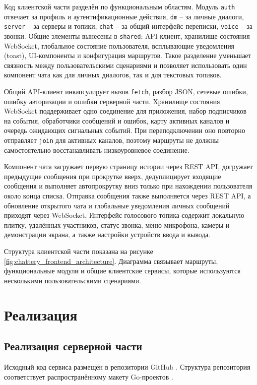 \documentclass[a4paper,12pt]{extarticle}
\begin{document}
Код клиентской части разделён по функциональным областям. Модуль \texttt{auth} отвечает за профиль и аутентификационные действия, \texttt{dm} -- за личные диалоги, \texttt{server} -- за серверы и топики, \texttt{chat} -- за общий интерфейс переписки, \texttt{voice} -- за звонки. Общие элементы вынесены в \texttt{shared}: API-клиент, хранилище состояния WebSocket, глобальное состояние пользователя, всплывающие уведомления (toast), UI-компоненты и конфигурация маршрутов. Такое разделение уменьшает связность между пользовательскими сценариями и позволяет использовать один компонент чата как для личных диалогов, так и для текстовых топиков.

Общий API-клиент инкапсулирует вызов \texttt{fetch}, разбор JSON, сетевые ошибки, ошибку авторизации и ошибки серверной части. Хранилище состояния WebSocket поддерживает одно соединение для приложения, набор подписчиков на события, обработчики сообщений и ошибок, карту активных каналов и очередь ожидающих сигнальных событий. При переподключении оно повторно отправляет \texttt{join} для активных каналов, поэтому маршруты не должны самостоятельно восстанавливать низкоуровневое соединение.

Компонент чата загружает первую страницу истории через REST API, догружает предыдущие сообщения при прокрутке вверх, дедуплицирует входящие сообщения и выполняет автопрокрутку вниз только при нахождении пользователя около конца списка. Отправка сообщения также выполняется через REST API, а обновление открытого чата и глобальные уведомления личных сообщений приходят через WebSocket. Интерфейс голосового топика содержит локальную плитку, удалённых участников, статус звонка, меню микрофона, камеры и демонстрации экрана, а также настройки устройств ввода и вывода.

Структура клиентской части показана на рисунке \ref{fig:chattery_frontend_architecture}. Диаграмма связывает маршруты, функциональные модули и общие клиентские сервисы, которые используются несколькими пользовательскими сценариями.

\section{Реализация}

\subsection{Реализация серверной части}

Исходный код сервиса размещён в репозитории GitHub \cite{chattery_repo}. Структура репозитория соответствует распространённому макету Go-проектов \cite{go_project_layout}.
\end{document}
